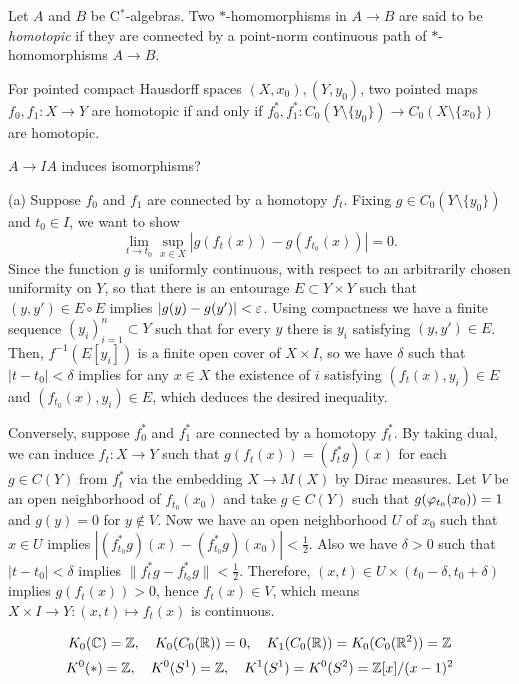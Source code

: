 \documentclass{../../large}
\begin{document}
\begin{prb}
Let $A$ and $B$ be C$^*$-algebras.
Two $*$-homomorphisms in $A\to B$ are said to be \emph{homotopic} if they are connected by a point-norm continuous path of $*$-homomorphisms $A\to B$.
\begin{parts}
\item For pointed compact Hausdorff spaces $(X,x_0),(Y,y_0)$, two pointed maps $f_0,f_1:X\to Y$ are homotopic if and only if $f_0^*,f_1^*:C_0(Y\setminus\{y_0\})\to C_0(X\setminus\{x_0\})$ are homotopic.
\item $A\to IA$ induces isomorphisms?
\end{parts}
\end{prb}
\begin{pf}
(a)
Suppose $f_0$ and $f_1$ are connected by a homotopy $f_t$.
Fixing $g\in C_0(Y\setminus\{y_0\})$ and $t_0\in I$, we want to show
\[\lim_{t\to t_0}\sup_{x\in X}|g(f_t(x))-g(f_{t_0}(x))|=0.\]
Since the function $g$ is uniformly continuous, with respect to an arbitrarily chosen uniformity on $Y$, so that there is an entourage $E\subset Y\times Y$ such that $(y,y')\in E\circ E$ implies $|g(y)-g(y')|<\varepsilon$.
Using compactness we have a finite sequence $(y_i)_{i=1}^n\subset Y$ such that for every $y$ there is $y_i$ satisfying $(y,y')\in E$.
Then, $f^{-1}(E[y_i])$ is a finite open cover of $X\times I$, so we have $\delta$ such that $|t-t_0|<\delta$ implies for any $x\in X$ the existence of $i$ satisfying $(f_t(x),y_i)\in E$ and $(f_{t_0}(x),y_i)\in E$, which deduces the desired inequality.

Conversely, suppose $f_0^*$ and $f_1^*$ are connected by a homotopy $f_t^*$.
By taking dual, we can induce $f_t:X\to Y$ such that $g(f_t(x))=(f_t^*g)(x)$ for each $g\in C(Y)$ from $f_t^*$ via the embedding $X\to M(X)$ by Dirac measures.
Let $V$ be an open neighborhood of $f_{t_0}(x_0)$ and take $g\in C(Y)$ such that $g(\varphi_{t_0}(x_0))=1$ and $g(y)=0$ for $y\notin V$.
Now we have an open neighborhood $U$ of $x_0$ such that $x\in U$ implies $|(f_{t_0}^*g)(x)-(f_{t_0}^*g)(x_0)|<\frac12$.
Also we have $\delta>0$ such that $|t-t_0|<\delta$ implies $\|f_t^*g-f_{t_0}^*g\|<\frac12$.
Therefore, $(x,t)\in U\times(t_0-\delta,t_0+\delta)$ implies $g(f_t(x))>0$, hence $f_t(x)\in V$, which means $X\times I\to Y:(x,t)\mapsto f_t(x)$ is continuous.
\end{pf}


\[K_0(\mathbb{C})=\mathbb{Z},\quad K_0(C_0(\mathbb{R}))=0,\quad K_1(C_0(\mathbb{R}))=K_0(C_0(\mathbb{R}^2))=\mathbb{Z}\]
\[K^0(*)=\mathbb{Z},\quad K^0(S^1)=\mathbb{Z},\quad K^1(S^1)=K^0(S^2)=\mathbb{Z}[x]/(x-1)^2\]
\end{document}
